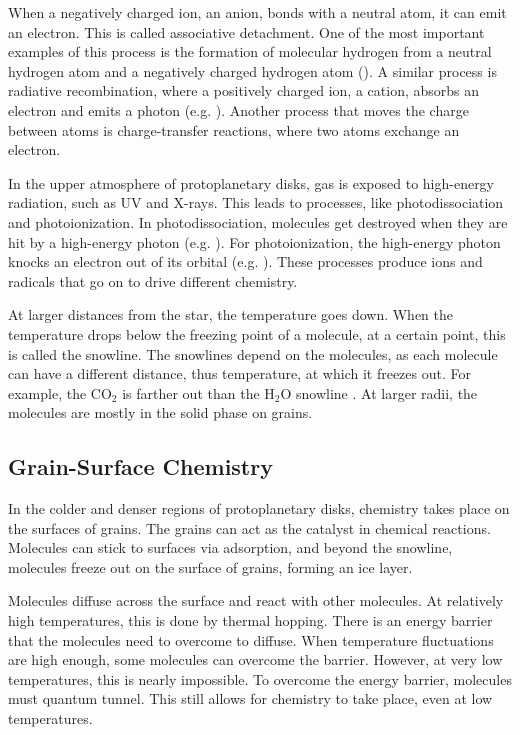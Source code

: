 \documentclass[oneside, single, authoryear, semicolon, 12pt]{lion-msc}
\newcommand{\4}{$_4$}
\newcommand{\3}{$_3$}
\newcommand{\2}{$_2$}
\begin{document}
When a negatively charged ion, an anion, bonds with a neutral atom, it can emit an electron. This is called associative detachment. One of the most important examples of this process is the formation of molecular hydrogen from a neutral hydrogen atom and a negatively charged hydrogen atom (). A similar process is radiative recombination, where a positively charged ion, a cation, absorbs an electron and emits a photon (e.g. ). Another process that moves the charge between atoms is charge-transfer reactions, where two atoms exchange an electron.

In the upper atmosphere of protoplanetary disks, gas is exposed to high-energy radiation, such as UV and X-rays. This leads to processes, like photodissociation and photoionization. In photodissociation, molecules get destroyed when they are hit by a high-energy photon (e.g. ). For photoionization, the high-energy photon knocks an electron out of its orbital (e.g.  ). These processes produce ions and radicals that go on to drive different chemistry. 

At larger distances from the star, the temperature goes down. When the temperature drops below the freezing point of a molecule, at a certain point, this is called the snowline. The snowlines depend on the molecules, as each molecule can have a different distance, thus temperature, at which it freezes out. For example, the CO\2 is farther out than the H\2O snowline \citep{vlasblom2023midinfraredspectrattauri}. At larger radii, the molecules are mostly in the solid phase on grains.  

\subsection{Grain-Surface Chemistry}
In the colder and denser regions of protoplanetary disks, chemistry takes place on the surfaces of grains.  The grains can act as the catalyst in chemical reactions. Molecules can stick to surfaces via adsorption, and beyond the snowline, molecules freeze out on the surface of grains, forming an ice layer. 

Molecules diffuse across the surface and react with other molecules. At relatively high temperatures, this is done by thermal hopping. There is an energy barrier that the molecules need to overcome to diffuse. When temperature fluctuations are high enough, some molecules can overcome the barrier. However, at very low temperatures, this is nearly impossible. To overcome the energy barrier, molecules must quantum tunnel. This still allows for chemistry to take place, even at low temperatures. 
\end{document}

